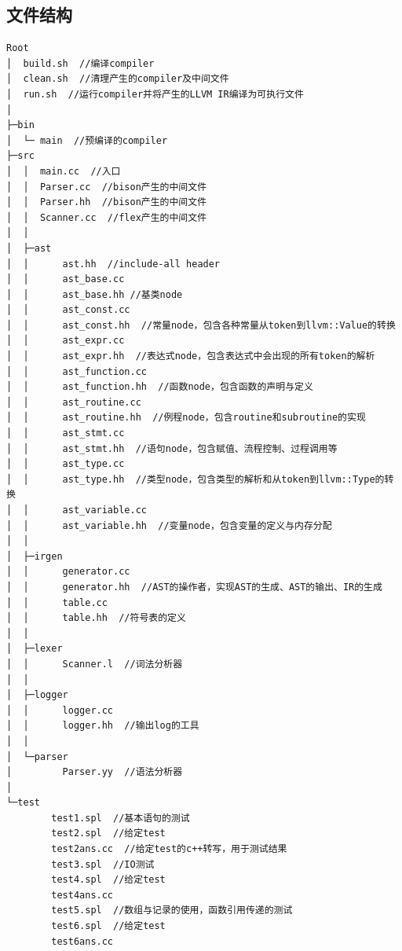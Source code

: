 \documentclass{article}
\begin{document}
\subsection*{文件结构}
\begin{lstlisting}
Root
│  build.sh  //编译compiler
│  clean.sh  //清理产生的compiler及中间文件
│  run.sh  //运行compiler并将产生的LLVM IR编译为可执行文件
│
├─bin
│  └─ main  //预编译的compiler
├─src
│  │  main.cc  //入口
│  │  Parser.cc  //bison产生的中间文件
│  │  Parser.hh  //bison产生的中间文件
│  │  Scanner.cc  //flex产生的中间文件
│  │
│  ├─ast
│  │      ast.hh  //include-all header
│  │      ast_base.cc
│  │      ast_base.hh //基类node
│  │      ast_const.cc
│  │      ast_const.hh  //常量node，包含各种常量从token到llvm::Value的转换
│  │      ast_expr.cc
│  │      ast_expr.hh  //表达式node，包含表达式中会出现的所有token的解析
│  │      ast_function.cc
│  │      ast_function.hh  //函数node，包含函数的声明与定义
│  │      ast_routine.cc
│  │      ast_routine.hh  //例程node，包含routine和subroutine的实现
│  │      ast_stmt.cc
│  │      ast_stmt.hh  //语句node，包含赋值、流程控制、过程调用等
│  │      ast_type.cc
│  │      ast_type.hh  //类型node，包含类型的解析和从token到llvm::Type的转换
│  │      ast_variable.cc
│  │      ast_variable.hh  //变量node，包含变量的定义与内存分配
│  │
│  ├─irgen
│  │      generator.cc
│  │      generator.hh  //AST的操作者，实现AST的生成、AST的输出、IR的生成
│  │      table.cc
│  │      table.hh  //符号表的定义
│  │
│  ├─lexer
│  │      Scanner.l  //词法分析器
│  │
│  ├─logger
│  │      logger.cc
│  │      logger.hh  //输出log的工具
│  │
│  └─parser
│         Parser.yy  //语法分析器
│
└─test
        test1.spl  //基本语句的测试
        test2.spl  //给定test
        test2ans.cc  //给定test的c++转写，用于测试结果
        test3.spl  //IO测试
        test4.spl  //给定test
        test4ans.cc
        test5.spl  //数组与记录的使用，函数引用传递的测试
        test6.spl  //给定test
        test6ans.cc

\end{lstlisting}
\end{document}
